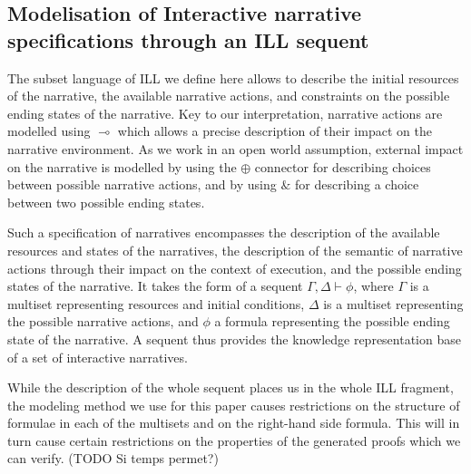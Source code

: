 \documentclass[runningheads,a4paper]{llncs}
\begin{document}
\subsection{Modelisation of Interactive narrative specifications through an ILL sequent}

The subset language of ILL we define here allows to describe the initial resources of the narrative, the available narrative actions, and constraints on the possible ending states of the narrative. Key to our interpretation, narrative actions are modelled using $\multimap$ which allows a precise description of their impact on the narrative environment. As we work in an open world assumption, external impact on the narrative is modelled by using the $\oplus$ connector for describing choices between possible narrative actions, and by using $\&$ for describing a choice between two possible ending states.

Such a specification of narratives encompasses the description of the available resources and states of the narratives, the description of the semantic of narrative actions through their impact on the context of execution, and the possible ending states of the narrative. It takes the form of a sequent $\Gamma , \Delta \vdash \phi$, where $\Gamma$ is a multiset representing resources and initial conditions, $\Delta$ is a multiset representing the possible narrative actions, and $\phi$ a formula representing the possible ending state of the narrative. A sequent thus provides the knowledge representation base of a set of interactive narratives. 

While the description of the whole sequent places us in the whole ILL fragment, the modeling method we use for this paper causes restrictions on the structure of formulae in each of the multisets and on the right-hand side formula. This will in turn cause certain restrictions on the properties of the generated proofs which we can verify. (TODO Si temps permet?)
%
\end{document}
